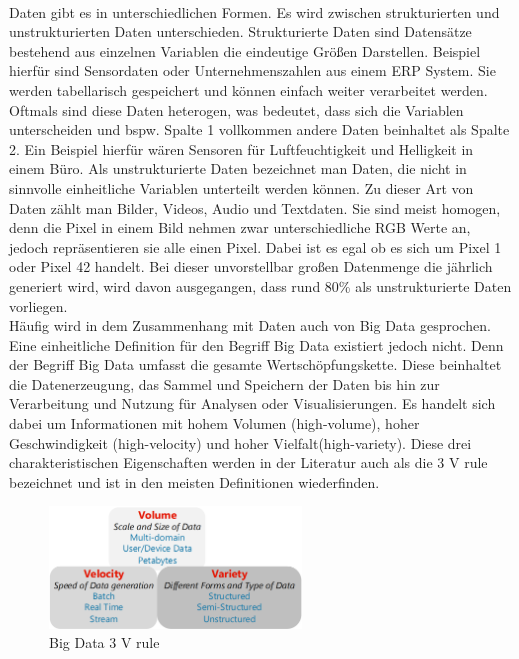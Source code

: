 \begin{onehalfspace}
        \\
        Daten gibt es in unterschiedlichen Formen. Es wird zwischen strukturierten und unstrukturierten Daten unterschieden. Strukturierte Daten sind Datensätze bestehend aus einzelnen Variablen die eindeutige Größen Darstellen. Beispiel hierfür sind Sensordaten oder Unternehmenszahlen aus einem ERP System. Sie werden tabellarisch gespeichert und können einfach weiter verarbeitet werden. Oftmals sind diese Daten heterogen, was bedeutet, dass sich die Variablen unterscheiden und bspw. Spalte 1 vollkommen andere Daten beinhaltet als Spalte 2. Ein Beispiel hierfür wären Sensoren für Luftfeuchtigkeit und Helligkeit in einem Büro. Als unstrukturierte Daten bezeichnet man Daten, die nicht in sinnvolle einheitliche Variablen unterteilt werden können. Zu dieser Art von Daten zählt man Bilder, Videos, Audio und Textdaten. Sie sind meist homogen, denn die Pixel in einem Bild nehmen zwar unterschiedliche RGB Werte an, jedoch repräsentieren sie alle einen Pixel. Dabei ist es egal ob es sich um Pixel 1 oder Pixel 42 handelt.\cite{Horn2022} Bei dieser unvorstellbar großen Datenmenge die jährlich generiert wird, wird davon ausgegangen, dass rund 80\% als unstrukturierte Daten vorliegen.\cite{Otto2019}
        \\
        Häufig wird in dem Zusammenhang mit Daten auch von Big Data gesprochen. Eine einheitliche Definition für den Begriff Big Data existiert jedoch nicht. Denn der Begriff Big Data umfasst die gesamte Wertschöpfungskette. Diese beinhaltet die Datenerzeugung, das Sammel und Speichern der Daten bis hin zur Verarbeitung und Nutzung für Analysen oder Visualisierungen.\cite{Taleb2018}\cite{Faroukhi2020} Es handelt sich dabei um Informationen mit hohem Volumen (high-volume), hoher Geschwindigkeit (high-velocity) und hoher Vielfalt(high-variety). Diese drei charakteristischen Eigenschaften werden in der Literatur auch als die \glqq{}3 V rule\grqq{} bezeichnet und ist in den meisten Definitionen wiederfinden.\cite{Taleb2018}\cite{Yalaoui2021} 
        \begin{figure}[h]
            \centering
            \includegraphics[width = 6.7cm]{Bilder/3VRule.png}
            \caption{Big Data 3 V rule \cite{Taleb2018}}

\end{figure}
\end{onehalfspace}
